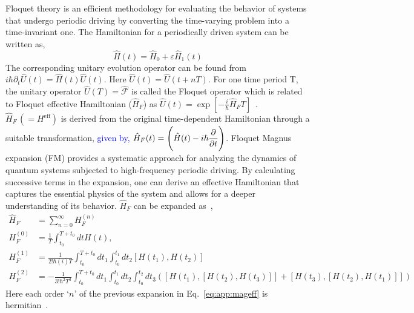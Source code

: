 \documentclass[%
nofootinbib,
reprint,
superscriptaddress,
amsmath,amssymb,showkeys,
aps,
prb,
]{revtex4-2}
\newcommand{\blue}[1]{\textcolor{blue}{#1}}
\begin{document}
	Floquet theory is an efficient methodology for evaluating the behavior of systems that undergo periodic driving by converting the time-varying problem into a time-invariant one. The Hamiltonian for a periodically driven system can be written as,
	\begin{equation*}
		\hat{H}(t) = \hat{H}_0 + \varepsilon \hat{H}_1(t)
	\end{equation*}
	The corresponding unitary evolution operator can be found from $\displaystyle{i\hbar \partial_t \hat{U}(t) = \hat{H}(t) \hat{U}(t)}$. Here $\displaystyle{\hat{U}(t) = \hat{U}(t+ nT)}$. For one time period T, the unitary operator $\displaystyle \hat{U}(T) = \hat{\mathcal{F}}$ is called the Floquet operator which is related to Floquet effective Hamiltonian ($\hat{H}_F$) as $\hat{U}(t) = \exp[-\frac{i}{\hbar}\hat{H}_F T]$~\cite{Eckardt_2015}. $\hat{H}_F\,(=H^\mathrm{eff})$ is derived from the original time-dependent Hamiltonian through a suitable transformation, \blue{given by, $\displaystyle \hat{H}_F(t) = \Bigg(\hat{H}(t) - i\hbar \pdv{t}\Bigg)$}. Floquet Magnus expansion (FM) provides a systematic approach for analyzing the dynamics of quantum systems subjected to high-frequency periodic driving. By calculating successive terms in the expansion, one can derive an effective Hamiltonian that captures the essential physics of the system and allows for a deeper understanding of its behavior. $\hat{H}_F$ can be expanded as~\cite{Sen_2021},	
	\begin{align}
		\hat{H}_F &= \sum_{n=0}^{\infty} H_F^{(n)}\nonumber\\
		H_F^{(0)} &= \frac{1}{T} \int_{t_0}^{T+t_0} dt H(t), \nonumber\\
		H_F^{(1)} &= \frac{1}{2!\hbar(i)T} \int_{t_0}^{T+t_0} dt_1  \int_{t_0}^{t_1} dt_2 [H(t_1), H(t_2)]\nonumber\\
		H_F^{(2)} &= -\frac{1}{3!\hbar^2 T^3} \int_{t_0}^{T+t_0} dt_1  \int_{t_0}^{t_1} dt_2 \int_{t_0}^{t_2} dt_3([H(t_1),[H(t_2), H(t_3)]] + [H(t_3),[H(t_2), H(t_1)]])
		\label{eq:app:mageff}
	\end{align} 
	Here each order `$n$' of the previous expansion in Eq.~\ref{eq:app:mageff} is hermitian~\cite{haldar_statistical_2022}.
	
\end{document}
